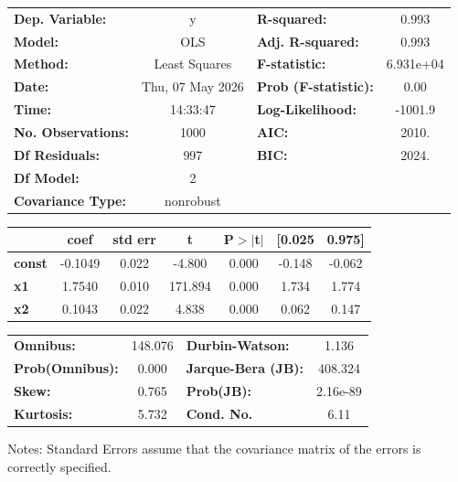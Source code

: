 \begin{center}
\begin{tabular}{lclc}
\toprule
\textbf{Dep. Variable:}    &        y         & \textbf{  R-squared:         } &     0.993   \\
\textbf{Model:}            &       OLS        & \textbf{  Adj. R-squared:    } &     0.993   \\
\textbf{Method:}           &  Least Squares   & \textbf{  F-statistic:       } & 6.931e+04   \\
\textbf{Date:}             & Thu, 07 May 2026 & \textbf{  Prob (F-statistic):} &     0.00    \\
\textbf{Time:}             &     14:33:47     & \textbf{  Log-Likelihood:    } &   -1001.9   \\
\textbf{No. Observations:} &        1000      & \textbf{  AIC:               } &     2010.   \\
\textbf{Df Residuals:}     &         997      & \textbf{  BIC:               } &     2024.   \\
\textbf{Df Model:}         &           2      & \textbf{                     } &             \\
\textbf{Covariance Type:}  &    nonrobust     & \textbf{                     } &             \\
\bottomrule
\end{tabular}
\begin{tabular}{lcccccc}
               & \textbf{coef} & \textbf{std err} & \textbf{t} & \textbf{P$> |$t$|$} & \textbf{[0.025} & \textbf{0.975]}  \\
\midrule
\textbf{const} &      -0.1049  &        0.022     &    -4.800  &         0.000        &       -0.148    &       -0.062     \\
\textbf{x1}    &       1.7540  &        0.010     &   171.894  &         0.000        &        1.734    &        1.774     \\
\textbf{x2}    &       0.1043  &        0.022     &     4.838  &         0.000        &        0.062    &        0.147     \\
\bottomrule
\end{tabular}
\begin{tabular}{lclc}
\textbf{Omnibus:}       & 148.076 & \textbf{  Durbin-Watson:     } &    1.136  \\
\textbf{Prob(Omnibus):} &   0.000 & \textbf{  Jarque-Bera (JB):  } &  408.324  \\
\textbf{Skew:}          &   0.765 & \textbf{  Prob(JB):          } & 2.16e-89  \\
\textbf{Kurtosis:}      &   5.732 & \textbf{  Cond. No.          } &     6.11  \\
\bottomrule
\end{tabular}
\end{center}

Notes: \newline
 [1] Standard Errors assume that the covariance matrix of the errors is correctly specified.